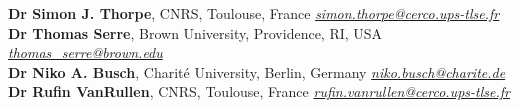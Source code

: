 \documentclass[margin,line]{resume}
\begin{document}
\begin{resume}
	\textbf{Dr Simon J. Thorpe}, CNRS, Toulouse, France  \hfill \textsl{\href{mailto:simon.thorpe@cerco.ups-tlse.fr}{simon.thorpe@cerco.ups-tlse.fr}}\\
	\textbf{Dr Thomas Serre}, Brown University, Providence, RI, USA \hfill \textsl{\href{mailto:thomas_serre@brown.edu}{thomas\_serre@brown.edu}} \\
	\textbf{Dr Niko A. Busch}, Charité University, Berlin, Germany \hfill \textsl{\href{mailto:niko.busch@charite.de}{niko.busch@charite.de}} \\
	\textbf{Dr Rufin VanRullen}, CNRS, Toulouse, France \hfill \textsl{\href{mailto:rufin.vanrullen@cerco.ups-tlse.fr}{rufin.vanrullen@cerco.ups-tlse.fr}} \\

\end{resume}
\end{document}
